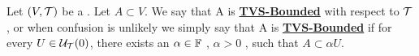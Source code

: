 \label{def:topologicalvectorspaceboundedset}
\newcommand{\TVSBounded}[0]{\textbf{\hyperref[def:topologicalvectorspaceboundedset]{TVS-Bounded}}\xspace}

\begin{df}
Let $(V,\mathcal{T})$ be a 
\TVS.
Let $A \subset V$. 
We say that A is \TVSBounded with respect to $\mathcal{T}$,
or when confusion is unlikely we simply say that A is \TVSBounded
if for every $U \in \mathcal{U}_{\mathcal{T}}(0)$, there exists an $\alpha \in \mathbb{F}$
, $\alpha > 0$
, such that $A \subset \alpha U$. 
\end{df}
